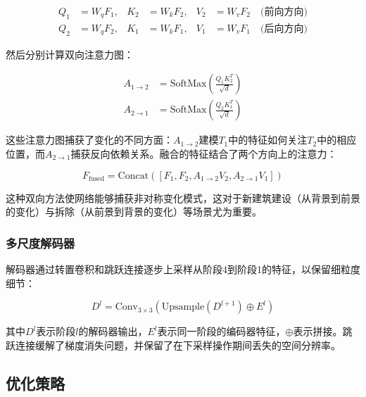 \documentclass[journal]{IEEEtran}
\begin{document}
\begin{equation}
\begin{aligned}
Q_1 &= W_q F_1, & K_2 &= W_k F_2, & V_2 &= W_v F_2 \quad \text{(前向方向)} \\
Q_2 &= W_q F_2, & K_1 &= W_k F_1, & V_1 &= W_v F_1 \quad \text{(后向方向)}
\end{aligned}
\label{eq:qkv}
\end{equation}

然后分别计算双向注意力图：

\begin{equation}
\begin{aligned}
A_{1 \rightarrow 2} &= \text{SoftMax}\left(\frac{Q_1 K_2^T}{\sqrt{d}}\right) \\
A_{2 \rightarrow 1} &= \text{SoftMax}\left(\frac{Q_2 K_1^T}{\sqrt{d}}\right)
\end{aligned}
\label{eq:btf}
\end{equation}

这些注意力图捕获了变化的不同方面：$A_{1 \rightarrow 2}$建模$T_1$中的特征如何关注$T_2$中的相应位置，而$A_{2 \rightarrow 1}$捕获反向依赖关系。融合的特征结合了两个方向上的注意力：

\begin{equation}
F_{\text{fused}} = \text{Concat}([F_1, F_2, A_{1 \rightarrow 2} V_2, A_{2 \rightarrow 1} V_1])
\label{eq:fusion}
\end{equation}

这种双向方法使网络能够捕获非对称变化模式，这对于新建筑建设（从背景到前景的变化）与拆除（从前景到背景的变化）等场景尤为重要。

\subsubsection{多尺度解码器}

解码器通过转置卷积和跳跃连接逐步上采样从阶段4到阶段1的特征，以保留细粒度细节：

\begin{equation}
D^l = \text{Conv}_{3\times 3}(\text{Upsample}(D^{l+1}) \oplus E^l)
\label{eq:decoder}
\end{equation}

其中$D^l$表示阶段$l$的解码器输出，$E^l$表示同一阶段的编码器特征，$\oplus$表示拼接。跳跃连接缓解了梯度消失问题，并保留了在下采样操作期间丢失的空间分辨率。

\subsection{优化策略}
\end{document}
